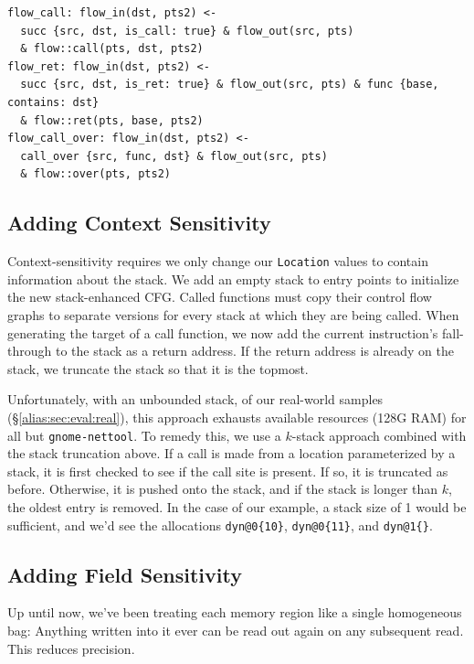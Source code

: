 \begin{lstlisting}[float=*t, caption={Inter-procedural Rules}, label=lst:interrules]
flow_call: flow_in(dst, pts2) <-
  succ {src, dst, is_call: true} & flow_out(src, pts)
  & flow::call(pts, dst, pts2)
flow_ret: flow_in(dst, pts2) <-
  succ {src, dst, is_ret: true} & flow_out(src, pts) & func {base, contains: dst}
  & flow::ret(pts, base, pts2)
flow_call_over: flow_in(dst, pts2) <-
  call_over {src, func, dst} & flow_out(src, pts)
  & flow::over(pts, pts2)
\end{lstlisting}





\subsection{Adding Context Sensitivity}
Context-sensitivity requires we only change our \texttt{Location}
values to contain information about the stack.
We add an empty stack to entry points to initialize the new stack-enhanced CFG.
Called functions must copy their control flow graphs to separate versions for every stack at which they are being called.
When generating the target of a call function, we now add the current instruction's fall-through to the stack as a return address.
If the return address is already on the stack, we truncate the stack so that it is the topmost.

Unfortunately, with an unbounded stack, of our real-world samples (\S \ref{alias:sec:eval:real}), this approach exhausts available resources (128G RAM) for all but \texttt{gnome-nettool}.
To remedy this, we use a $k$-stack approach combined with the stack truncation above.
If a call is made from a location parameterized by a stack, it is first checked to see if the call site is present.
If so, it is truncated as before.
Otherwise, it is pushed onto the stack, and if the stack is longer than $k$, the oldest entry is removed.
In the case of our example, a stack size of 1 would be sufficient, and we'd see the allocations \texttt{dyn@0\{10\}}, \texttt{dyn@0\{11\}}, and \texttt{dyn@1\{\}}.

\subsection{Adding Field Sensitivity}
\label{sec:field}
Up until now, we've been treating each memory region like a single homogeneous bag:
Anything written into it ever can be read out again on any subsequent read.
This reduces precision.

